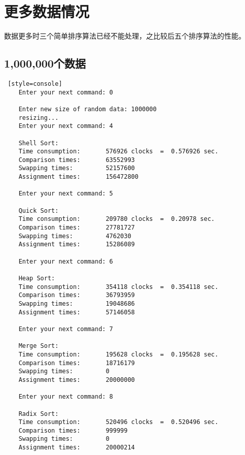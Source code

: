 \section{更多数据情况}

数据更多时三个简单排序算法已经不能处理，之比较后五个排序算法的性能。

\subsection{1,000,000个数据}
\begin{lstlisting} [style=console]
    Enter your next command: 0

    Enter new size of random data: 1000000
    resizing...
    Enter your next command: 4
    
    Shell Sort:
    Time consumption:		576926 clocks  =  0.576926 sec.
    Comparison times:		63552993
    Swapping times:  		52157600
    Assignment times:		156472800
    
    Enter your next command: 5
    
    Quick Sort:
    Time consumption:		209780 clocks  =  0.20978 sec.
    Comparison times:		27781727
    Swapping times:  		4762030
    Assignment times:		15286089
    
    Enter your next command: 6
    
    Heap Sort:
    Time consumption:		354118 clocks  =  0.354118 sec.
    Comparison times:		36793959
    Swapping times:  		19048686
    Assignment times:		57146058
    
    Enter your next command: 7
    
    Merge Sort:
    Time consumption:		195628 clocks  =  0.195628 sec.
    Comparison times:		18716179
    Swapping times:  		0
    Assignment times:		20000000
    
    Enter your next command: 8
    
    Radix Sort:
    Time consumption:		520496 clocks  =  0.520496 sec.
    Comparison times:		999999
    Swapping times:  		0
    Assignment times:		20000214
\end{lstlisting}

